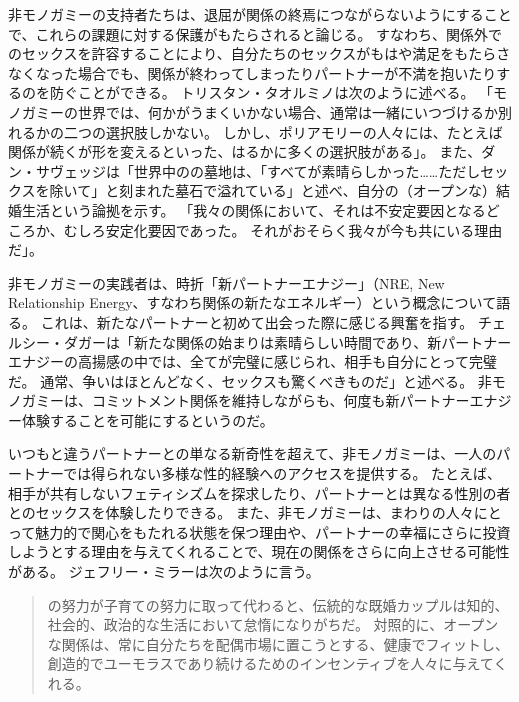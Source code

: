 \documentclass[paper=a4,book,openany]{jlreq} \usepackage{mystyle}
\begin{document}
非モノガミーの支持者たちは、退屈が関係の終焉につながらないようにすることで、これらの課題に対する保護がもたらされると論じる。
すなわち、関係外でのセックスを許容することにより、自分たちのセックスがもはや満足をもたらさなくなった場合でも、関係が終わってしまったりパートナーが不満を抱いたりするのを防ぐことができる。
トリスタン・タオルミノは次のように述べる。
「モノガミーの世界では、何かがうまくいかない場合、通常は一緒にいつづけるか別れるかの二つの選択肢しかない。
しかし、ポリアモリーの人々には、たとえば関係が続くが形を変えるといった、はるかに多くの選択肢がある」\citep[p.217]{taormino08:_openin_up}。
また、ダン・サヴェッジは「世界中のの墓地は、「すべてが素晴らしかった……ただしセックスを除いて」と刻まれた墓石で溢れている」と述べ、自分の（オープンな）結婚生活という論拠を示す。
「我々の関係において、それは不安定要因となるどころか、むしろ安定化要因であった。
それがおそらく我々が今も共にいる理由だ」\citep{oppenheimer11:_married_infid}。

非モノガミーの実践者は、時折「新パートナーエナジー」（NRE, New Relationship Energy、すなわち関係の新たなエネルギー）という概念について語る。
これは、新たなパートナーと初めて出会った際に感じる興奮を指す。
チェルシー・ダガーは「新たな関係の始まりは素晴らしい時間であり、新パートナーエナジーの高揚感の中では、全てが完璧に感じられ、相手も自分にとって完璧だ。
通常、争いはほとんどなく、セックスも驚くべきものだ」と述べる\citep{dagger18:_weve_all_been_there}。
非モノガミーは、コミットメント関係を維持しながらも、何度も新パートナーエナジー体験することを可能にするというのだ。

いつもと違うパートナーとの単なる新奇性を超えて、非モノガミーは、一人のパートナーでは得られない多様な性的経験へのアクセスを提供する。
たとえば、相手が共有しないフェティシズムを探求したり、パートナーとは異なる性別の者とのセックスを体験したりできる。
また、非モノガミーは、まわりの人々にとって魅力的で関心をもたれる状態を保つ理由や、パートナーの幸福にさらに投資しようとする理由を与えてくれることで、現在の関係をさらに向上させる可能性がある。
ジェフリー・ミラーは次のように言う。

\begin{quote}
の努力が子育ての努力に取って代わると、伝統的な既婚カップルは知的、社会的、政治的な生活において怠惰になりがちだ。
対照的に、オープンな関係は、常に自分たちを配偶市場に置こうとする、健康でフィットし、創造的でユーモラスであり続けるためのインセンティブを人々に与えてくれる。
\citep{miller19:_polyam_is_growin}

\end{quote}
\end{document}
